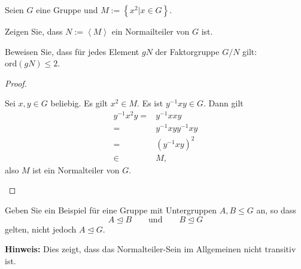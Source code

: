 \begin{Problem}
	Seien $G$ eine Gruppe und $M:=\left\{ x^2|x\in G \right\} $.
	\begin{parts}
	\item Zeigen Sie, dass $N:=\left<M \right>$ ein Normailteiler von $G$ ist.
	\item Beweisen Sie, dass für jedes Element $gN$ der Faktorgruppe $G / N$ gilt: $\text{ord}(gN)\le 2$.
	\end{parts}
\end{Problem}
\begin{proof}
	\begin{parts}
	\item Sei $x,y\in G$ beliebig. Es gilt $x^2\in M$. Es ist $y^{-1}xy\in G$. Dann gilt
		\begin{align*}
			y^{-1}x^2y=&y^{-1}x xy\\
			=&y^{-1}xyy^{-1}xy\\
			=&(y^{-1}xy)^2\\
			\in& M,
		\end{align*}
		also $M$ ist ein Normalteiler von $G$.
	\end{parts}
\end{proof}
\begin{Problem}
	Geben Sie ein Beispiel für eine Gruppe mit Untergruppen $A,B\le G$ an, so dass
	\[
		A\trianglelefteq B\qquad\text{und}\qquad B\trianglelefteq G
	\]
	gelten, nicht jedoch $A\trianglelefteq G$.

	{\footnotesize \textbf{Hinweis:} Dies zeigt, dass das Normalteiler-Sein im Allgemeinen nicht transitiv ist.}
\end{Problem}


